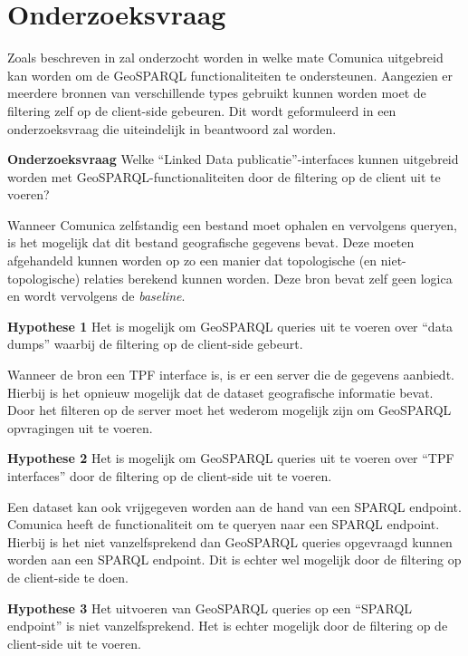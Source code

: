 \section{Onderzoeksvraag}
\label{sec:onderzoeksvraag}
Zoals beschreven in  zal onderzocht worden in welke mate Comunica uitgebreid kan worden om de GeoSPARQL functionaliteiten te ondersteunen. Aangezien er meerdere bronnen van verschillende types gebruikt kunnen worden moet de filtering zelf op de client-side gebeuren. Dit wordt geformuleerd in een onderzoeksvraag die uiteindelijk in  beantwoord zal worden. 

\textbf{Onderzoeksvraag} Welke “Linked Data publicatie”-interfaces kunnen uitgebreid worden met GeoSPARQL-functionaliteiten door de filtering op de client uit te voeren?

Wanneer Comunica zelfstandig een bestand moet ophalen en vervolgens queryen, is het mogelijk dat dit bestand geografische gegevens bevat. Deze moeten afgehandeld kunnen worden op zo een manier dat topologische (en niet-topologische) relaties berekend kunnen worden. Deze bron bevat zelf geen logica en wordt vervolgens de \textit{baseline}.

\textbf{Hypothese 1} Het is mogelijk om GeoSPARQL queries uit te voeren over ``data dumps'' waarbij de filtering op de client-side gebeurt.

Wanneer de bron een TPF interface is, is er een server die de gegevens aanbiedt. Hierbij is het opnieuw mogelijk dat de dataset geografische informatie bevat. Door het filteren op de server moet het wederom mogelijk zijn om GeoSPARQL opvragingen uit te voeren.

\textbf{Hypothese 2} Het is mogelijk om GeoSPARQL queries uit te voeren over ``TPF interfaces'' door de filtering op de client-side uit te voeren.

Een dataset kan ook vrijgegeven worden aan de hand van een SPARQL endpoint. Comunica heeft de functionaliteit om te queryen naar een SPARQL endpoint. Hierbij is het niet vanzelfsprekend dan GeoSPARQL queries opgevraagd kunnen worden aan een SPARQL endpoint. Dit is echter wel mogelijk door de filtering op de client-side te doen.

\textbf{Hypothese 3} Het uitvoeren van GeoSPARQL queries op een ``SPARQL endpoint'' is niet vanzelfsprekend. Het is echter mogelijk door de filtering op de client-side uit te voeren.